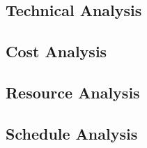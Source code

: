 \subsection{Technical Analysis}

\subsection{Cost Analysis}

\subsection{Resource Analysis}

\subsection{Schedule Analysis}
